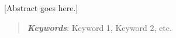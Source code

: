 
[Abstract goes here.]

\begin{quote}
	
	\textbf{\textit{Keywords}}: Keyword 1, Keyword 2, etc.
\end{quote}